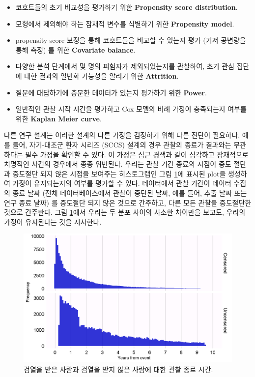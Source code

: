 \documentclass[11pt]{book}
\providecommand{\tightlist}{%
  \setlength{\itemsep}{0pt}\setlength{\parskip}{0pt}}
\theoremstyle{definition}
\theoremstyle{definition}
\theoremstyle{definition}
\theoremstyle{remark}
\begin{document}
\begin{itemize}
\tightlist
\item
  코호트들의 초기 비교성을 평가하기 위한 \textbf{Propensity score
  distribution}.
\item
  모형에서 제외해야 하는 잠재적 변수를 식별하기 위한 \textbf{Propensity
  model}.
\item
  propensity score 보정을 통해 코호트들을 비교할 수 있는지 평가 (기저
  공변량을 통해 측정) 를 위한 \textbf{Covariate balance}.
\item
  다양한 분석 단계에서 몇 명의 피험자가 제외되었는지를 관찰하여, 초기
  관심 집단에 대한 결과의 일반화 가능성을 알리기 위한
  \textbf{Attrition}.
\item
  질문에 대답하기에 충분한 데이터가 있는지 평가하기 위한 \textbf{Power}.
\item
  일반적인 관찰 시작 시간을 평가하고 Cox 모델의 비례 가정이 충족되는지
  여부를 위한 \textbf{Kaplan Meier curve}.
\end{itemize}

다른 연구 설계는 이러한 설계의 다른 가정을 검정하기 위해 다른 진단이
필요하다. 예를 들어, 자기-대조군 환자 시리즈 (SCCS) 설계의 경우 관찰의
종료가 결과와는 무관하다는 필수 가정을 확인할 수 있다. 이 가정은 심근
경색과 같이 심각하고 잠재적으로 치명적인 사건의 경우에서 종종 위반된다.
우리는 관찰 기간 종료의 시점이 중도 절단과 중도절단 되지 않은 시점을
보여주는 히스토그램인 그림 \ref{fig:timeToObsEnd}에 표시된 plot을
생성하여 가정이 유지되는지의 여부를 평가할 수 있다. 데이터에서 관찰
기간이 데이터 수집의 종료 날짜 (전체 데이터베이스에서 관찰이 중단된
날짜, 예를 들어, 추출 날짜 또는 연구 종료 날짜) 를 중도절단 되지 않은
것으로 간주하고, 다른 모든 관찰을 중도절단한 것으로 간주한다. 그림
\ref{fig:timeToObsEnd}에서 우리는 두 분포 사이의 사소한 차이만을 보고도,
우리의 가정이 유지된다는 것을 시사한다.

\begin{figure}

{\centering \includegraphics[width=1\linewidth]{images/MethodValidity/timeToObsEnd} 

}

\caption{검열을 받은 사람과 검열을 받지 않은 사람에 대한 관찰 종료 시간.}\label{fig:timeToObsEnd}
\end{figure}
\end{document}
